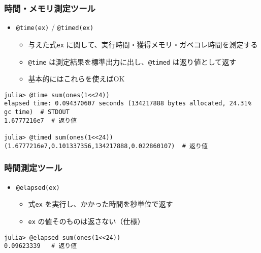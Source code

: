 \begin{frame}[containsverbatim]
  \frametitle{時間・メモリ測定ツール}
  \begin{itemize}
    \item \verb|@time(ex)| / \verb|@timed(ex)|
      \begin{itemize}
        \item 与えた式\verb|ex| に関して、実行時間・獲得メモリ・ガベコレ時間を測定する
        \item \verb|@time| は測定結果を標準出力に出し、\verb|@timed| は返り値として返す
        \item 基本的にはこれらを使えばOK
      \end{itemize}
  \end{itemize}
  \begin{lstlisting}
julia> @time sum(ones(1<<24))
elapsed time: 0.094370607 seconds (134217888 bytes allocated, 24.31% gc time)  # STDOUT
1.6777216e7  # 返り値

julia> @timed sum(ones(1<<24))
(1.6777216e7,0.101337356,134217888,0.022860107)  # 返り値
  \end{lstlisting}
\end{frame}

\begin{frame}[containsverbatim]
  \frametitle{時間測定ツール}
  \begin{itemize}
    \item \verb|@elapsed(ex)|
      \begin{itemize}
        \item 式\verb|ex| を実行し、かかった時間を秒単位で返す
        \item \verb|ex| の値そのものは返さない（仕様）
      \end{itemize}
  \end{itemize}
  \begin{lstlisting}
julia> @elapsed sum(ones(1<<24))
0.09623339   # 返り値
  \end{lstlisting}
\end{frame}


